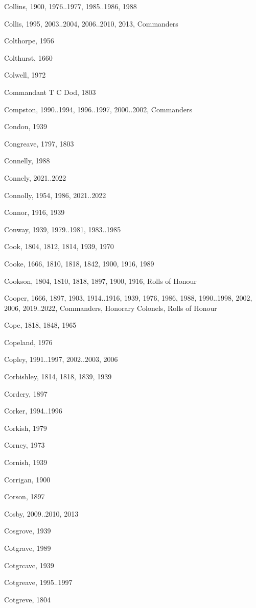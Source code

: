 {\begin{theindex}
\item Collins, 1900, 1976..1977, 1985..1986, 1988
\item Collis, 1995, 2003..2004, 2006..2010, 2013, Commanders
\item Colthorpe, 1956
\item Colthurst, 1660
\item Colwell, 1972
\item Commandant T C Dod, 1803
\item Compston, 1990..1994, 1996..1997, 2000..2002, Commanders
\item Condon, 1939
\item Congreave, 1797, 1803
\item Connelly, 1988
\item Connely, 2021..2022
\item Connolly, 1954, 1986, 2021..2022
\item Connor, 1916, 1939
\item Conway, 1939, 1979..1981, 1983..1985
\item Cook, 1804, 1812, 1814, 1939, 1970
\item Cooke, 1666, 1810, 1818, 1842, 1900, 1916, 1989
\item Cookson, 1804, 1810, 1818, 1897, 1900, 1916, Rolls of Honour
\item Cooper, 1666, 1897, 1903, 1914..1916, 1939, 1976, 1986, 1988, 1990..1998, 2002, 2006, 2019..2022, Commanders, Honorary Colonels, Rolls of Honour
\item Cope, 1818, 1848, 1965
\item Copeland, 1976
\item Copley, 1991..1997, 2002..2003, 2006
\item Corbishley, 1814, 1818, 1839, 1939
\item Cordery, 1897
\item Corker, 1994..1996
\item Corkish, 1979
\item Corney, 1973
\item Cornish, 1939
\item Corrigan, 1900
\item Corson, 1897
\item Cosby, 2009..2010, 2013
\item Cosgrove, 1939
\item Cotgrave, 1989
\item Cotgrcavc, 1939
\item Cotgreave, 1995..1997
\item Cotgreve, 1804

\end{theindex}}
